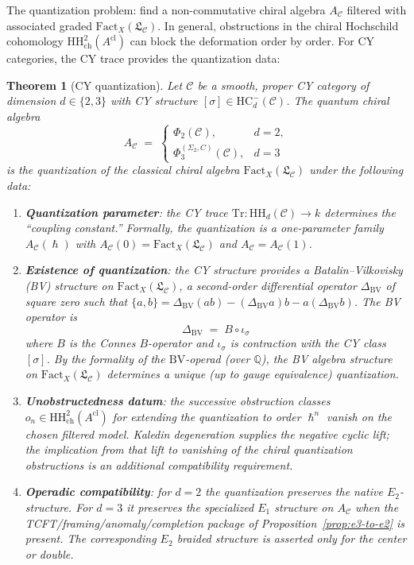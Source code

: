 \documentclass[11pt]{article}
\theoremstyle{plain}
\newtheorem{theorem}{Theorem}[section]
\theoremstyle{definition}
\theoremstyle{remark}
\newcommand{\Eone}{E_1}
\newcommand{\Etwo}{E_2}
\newcommand{\HH}{\mathrm{HH}}
\newcommand{\HC}{\mathrm{HC}}
\newcommand{\Tr}{\mathrm{Tr}}
\newcommand{\Fact}{\mathrm{Fact}}
\newcommand{\BV}{\mathrm{BV}}
\newcommand{\cC}{\mathcal{C}}
\newcommand{\frakL}{\mathfrak{L}}
\providecommand{\hbar}{\hslash}
\begin{document}
The quantization problem: find a non-commutative chiral algebra $A_\cC$ filtered with associated graded $\Fact_X(\frakL_\cC)$. In general, obstructions in the chiral Hochschild cohomology $\HH^2_{\mathrm{ch}}(A^{\mathrm{cl}})$ can block the deformation order by order. For CY categories, the CY trace provides the quantization data:

\begin{theorem}[CY quantization]
\label{thm:cy-quantization}
Let $\cC$ be a smooth, proper CY category of dimension $d \in \{2, 3\}$ with CY structure $[\sigma] \in \HC^-_d(\cC)$. The quantum chiral algebra
\[
A_\cC \;=\;
\begin{cases}
\Phi_2(\cC), & d=2,\\
\Phi_3^{(\Sigma_2,C)}(\cC), & d=3
\end{cases}
\]
is the quantization of the classical chiral algebra
$\Fact_X(\frakL_\cC)$ under the following data:
\begin{enumerate}[label=(\roman*)]
\item \textbf{Quantization parameter}: the CY trace $\Tr \colon \HH_d(\cC) \to k$ determines the ``coupling constant.'' Formally, the quantization is a one-parameter family $A_\cC(\hbar)$ with $A_\cC(0) = \Fact_X(\frakL_\cC)$ and $A_\cC = A_\cC(1)$.

\item \textbf{Existence of quantization}: the CY structure provides a \emph{Batalin--Vilkovisky} (BV) structure on $\Fact_X(\frakL_\cC)$, a second-order differential operator $\Delta_{\BV}$ of square zero such that $\{a, b\} = \Delta_{\BV}(ab) - (\Delta_{\BV} a)b - a(\Delta_{\BV} b)$. The BV operator is
\[
\Delta_{\BV} \;=\; B \circ \iota_\sigma
\]
where $B$ is the Connes $B$-operator and $\iota_\sigma$ is contraction with the CY class $[\sigma]$. By the formality of the $\BV$-operad (over $\mathbb{Q}$), the BV algebra structure on $\Fact_X(\frakL_\cC)$ determines a unique (up to gauge equivalence) quantization.

\item \textbf{Unobstructedness datum}: the successive obstruction
classes $o_n \in \HH^2_{\mathrm{ch}}(A^{\mathrm{cl}})$ for extending
the quantization to order $\hbar^n$ vanish on the chosen filtered
model. Kaledin degeneration supplies the negative cyclic lift; the
implication from that lift to vanishing of the chiral quantization
obstructions is an additional compatibility requirement.

\item \textbf{Operadic compatibility}: for $d=2$ the quantization
preserves the native $\Etwo$-structure. For $d=3$ it preserves the
specialized $\Eone$ structure on $A_\cC$ when the
TCFT/framing/anomaly/completion package of
Proposition~\ref{prop:e3-to-e2} is present. The corresponding
$\Etwo$ braided structure is asserted only for the center or double.
\end{enumerate}
\end{theorem}
\end{document}
